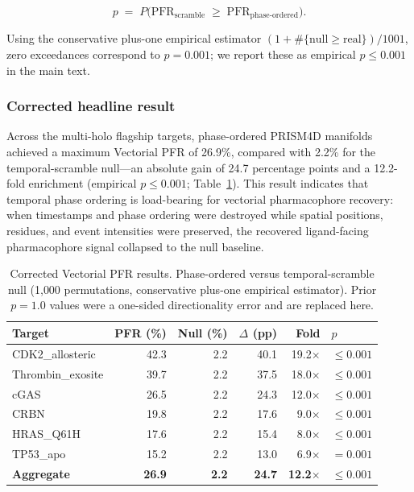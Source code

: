 \documentclass{sn-jnl}
\begin{document}
\[
  p \;=\; P\!\bigl(\mathrm{PFR}_{\mathrm{scramble}} \;\geq\;
                     \mathrm{PFR}_{\mathrm{phase\text{-}ordered}}\bigr).
\]

Using the conservative plus-one empirical estimator
$(1 + \#\{\mathrm{null} \geq \mathrm{real}\})/1001$, zero exceedances correspond
to $p = 0.001$; we report these as empirical $p \leq 0.001$ in the main text.

\subsubsection{Corrected headline result}

Across the multi-holo flagship targets, phase-ordered PRISM4D manifolds achieved
a maximum Vectorial PFR of 26.9\%, compared with 2.2\% for the temporal-scramble
null---an absolute gain of 24.7 percentage points and a 12.2-fold enrichment
(empirical $p \leq 0.001$; Table~\ref{tab:pfr}). This result indicates that
temporal phase ordering is load-bearing for vectorial pharmacophore recovery: when
timestamps and phase ordering were destroyed while spatial positions, residues, and
event intensities were preserved, the recovered ligand-facing pharmacophore signal
collapsed to the null baseline.

\begin{table}[htbp]
\centering
\caption{Corrected Vectorial PFR results. Phase-ordered versus temporal-scramble
         null (1{,}000 permutations, conservative plus-one empirical estimator).
         Prior $p = 1.0$ values were a one-sided directionality error and are
         replaced here.}
\label{tab:pfr}
\begin{tabular}{lrrrrl}
\toprule
\textbf{Target} &
\textbf{PFR (\%)} &
\textbf{Null (\%)} &
\textbf{$\Delta$ (pp)} &
\textbf{Fold} &
\textbf{$p$} \\
\midrule
CDK2\_allosteric      & 42.3 & 2.2 & 40.1 & 19.2$\times$ & ${\leq}0.001$ \\
Thrombin\_exosite     & 39.7 & 2.2 & 37.5 & 18.0$\times$ & ${\leq}0.001$ \\
cGAS                  & 26.5 & 2.2 & 24.3 & 12.0$\times$ & ${\leq}0.001$ \\
CRBN                  & 19.8 & 2.2 & 17.6 &  9.0$\times$ & ${\leq}0.001$ \\
HRAS\_Q61H            & 17.6 & 2.2 & 15.4 &  8.0$\times$ & ${\leq}0.001$ \\
TP53\_apo             & 15.2 & 2.2 & 13.0 &  6.9$\times$ & $= 0.001$     \\
\midrule
\textbf{Aggregate}    & \textbf{26.9} & \textbf{2.2} & \textbf{24.7} &
                        \textbf{12.2$\times$} & ${\leq}0.001$ \\
\bottomrule
\end{tabular}
\end{table}
\end{document}
